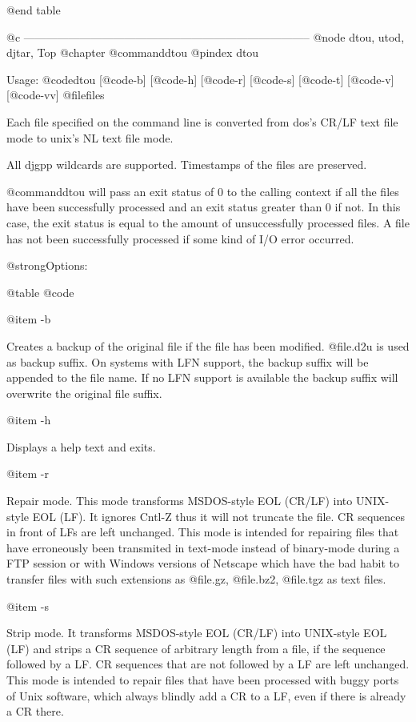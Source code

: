 @end table

@c -----------------------------------------------------------------------------
@node dtou, utod, djtar, Top
@chapter @command{dtou}
@pindex dtou

Usage: @code{dtou} [@code{-b}] [@code{-h}] [@code{-r}] [@code{-s}] [@code{-t}]
[@code{-v}] [@code{-vv}] @file{files}

Each file specified on the command line is converted from dos's CR/LF
text file mode to unix's NL text file mode.

All djgpp wildcards are supported.  Timestamps of the files are preserved.

@command{dtou} will pass an exit status of 0 to the calling context if all the
files have been successfully processed and an exit status greater than 0 if
not.  In this case, the exit status is equal to the amount of unsuccessfully
processed files.  A file has not been successfully processed if some kind of
I/O error occurred.

@strong{Options:}

@table @code

@item -b

Creates a backup of the original file if the file has been modified.
@file{.d2u} is used as backup suffix.  On systems with LFN support, the
backup suffix will be appended to the file name.  If no LFN support is
available the backup suffix will overwrite the original file suffix.

@item -h

Displays a help text and exits.

@item -r

Repair mode.  This mode transforms MSDOS-style EOL (CR/LF) into
UNIX-style EOL (LF).  It ignores Cntl-Z thus it will not truncate the file.
CR sequences in front of LFs are left unchanged.  This mode is intended
for repairing files that have erroneously been transmited in text-mode
instead of binary-mode during a FTP session or with Windows versions of
Netscape which have the bad habit to transfer files with such extensions
as @file{.gz}, @file{.bz2}, @file{.tgz} as text files.

@item -s

Strip mode.  It transforms MSDOS-style EOL (CR/LF) into UNIX-style EOL (LF)
and strips a CR sequence of arbitrary length from a file, if the sequence
followed by a LF.  CR sequences that are not followed by a LF are left
unchanged.  This mode is intended to repair files that have been processed
with buggy ports of Unix software, which always blindly add a CR to a LF,
even if there is already a CR there.

